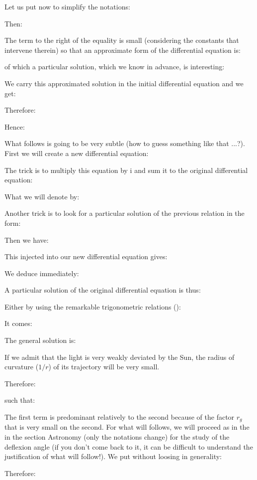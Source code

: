 	Let us put now to simplify the notations:
	
	Then:
	
	The term to the right of the equality is small (considering the constants that intervene therein) so that an approximate form of the differential equation is:
	
	of which a particular solution, which we know in advance, is interesting:
	
	We carry this approximated solution in the initial differential equation and we get:
	
	Therefore:
	
	Hence:
	
	What follows is going to be very subtle (how to guess something like that ...?). First we will create a new differential equation:
	
	The trick is to multiply this equation by $\mathrm{i}$ and sum it to the original differential equation:
	
	What we will denote by:
	
	Another trick is to look for a particular solution of the previous relation in the form:
	
	Then we have:
	
	This injected into our new differential equation gives:
	
	We deduce immediately:
	
	A particular solution of the original differential equation is thus:
	
	Either by using the remarkable trigonometric relations ():
	
	It comes:
	
	The general solution is:
	
	If we admit that the light is very weakly deviated by the Sun, the radius of curvature ($1/r$) of its trajectory will be very small.

	Therefore:
	
	such that:
	
	The first term is predominant relatively to the second because of the factor $r_g$ that is very small on the second. For what will follows, we will proceed as in the in the section Astronomy (only the notations change) for the study of the deflexion angle (if you don't come back to it, it can be difficult to understand the justification of what will follow!). We put without loosing in generality:
	
	Therefore:
	
